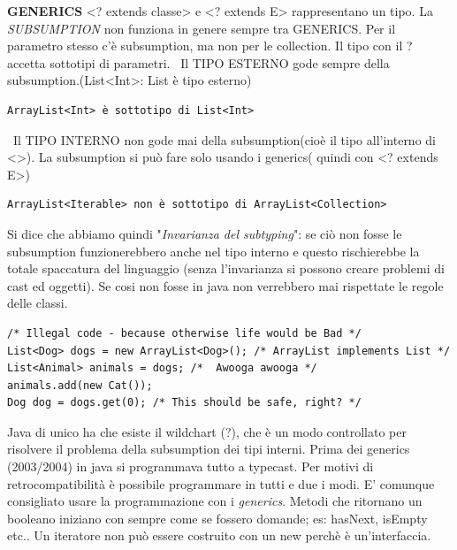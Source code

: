 \noindent \textbf{GENERICS}\newline
<? extends classe> e <? extends E> rappresentano un tipo. \newline
La \textit{SUBSUMPTION} non funziona in genere sempre tra GENERICS. Per il parametro stesso c'è subsumption, ma non per le collection. Il tipo con il ? accetta sottotipi di parametri.\newline
\textbullet\ Il TIPO ESTERNO gode sempre della subsumption.(List<Int>: List è tipo esterno)
\begin{lstlisting}[basicstyle=\small,]
 ArrayList<Int> è sottotipo di List<Int>
\end{lstlisting}
\noindent \textbullet\ Il TIPO INTERNO non gode mai della subsumption(cioè il tipo all'interno di <>). La subsumption si può fare solo usando i generics( quindi con <? extends E>)
\begin{lstlisting}[basicstyle=\small,]
 ArrayList<Iterable> non è sottotipo di ArrayList<Collection>
\end{lstlisting}
\noindent Si dice che abbiamo quindi "\textit{Invarianza del subtyping}": se ciò non fosse le subsumption funzionerebbero anche nel tipo interno e questo rischierebbe la totale spaccatura del linguaggio (senza l'invarianza si possono creare problemi di cast ed oggetti).\newline
Se cosi non fosse in java non verrebbero mai rispettate le regole delle classi.
\begin{lstlisting}[basicstyle=\small,]
/* Illegal code - because otherwise life would be Bad */
List<Dog> dogs = new ArrayList<Dog>(); /* ArrayList implements List */
List<Animal> animals = dogs; /*  Awooga awooga */
animals.add(new Cat());
Dog dog = dogs.get(0); /* This should be safe, right? */
\end{lstlisting}

\noindent Java di unico ha che esiste il wildchart (?), che è un modo controllato per risolvere il problema della subsumption dei tipi interni. \newline
Prima dei generics (2003/2004) in java si programmava tutto a typecast. Per motivi di retrocompatibilità è possibile programmare in tutti e due i modi. E' comunque consigliato usare la programmazione con i \textit{generics}. \newline
Metodi che ritornano un booleano iniziano con sempre come se fossero domande; es: hasNext, isEmpty etc.. \newline
Un iteratore non può essere costruito con un new perchè è un'interfaccia. 
\newpage
